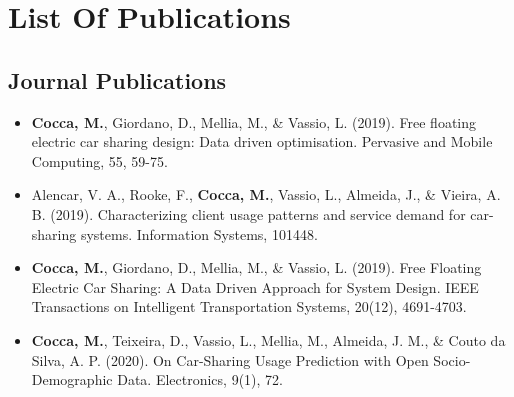 
\chapter{List Of Publications}
\section{Journal Publications}
\begin{itemize}
	\item \textbf{Cocca, M.}, Giordano, D., Mellia, M., & Vassio, L. (2019). Free floating electric car sharing design: Data driven optimisation. Pervasive and Mobile Computing, 55, 59-75.
	
	\item Alencar, V. A., Rooke, F., \textbf{Cocca, M.}, Vassio, L., Almeida, J., & Vieira, A. B. (2019). Characterizing client usage patterns and service demand for car-sharing systems. Information Systems, 101448.
	
	\item \textbf{Cocca, M.}, Giordano, D., Mellia, M., & Vassio, L. (2019). Free Floating Electric Car Sharing: A Data Driven Approach for System Design. IEEE Transactions on Intelligent Transportation Systems, 20(12), 4691-4703.
	
	\item \textbf{Cocca, M.}, Teixeira, D., Vassio, L., Mellia, M., Almeida, J. M., & Couto da Silva, A. P. (2020). On Car-Sharing Usage Prediction with Open Socio-Demographic Data. Electronics, 9(1), 72.
\end{itemize}



